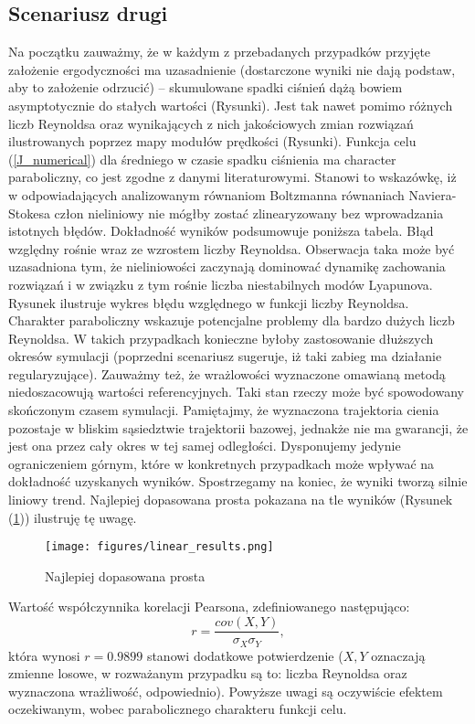 \documentclass[12pt]{article}
\begin{document}
\subsection{Scenariusz drugi}
Na początku zauważmy, że w każdym z przebadanych przypadków przyjęte założenie ergodyczności ma uzasadnienie (dostarczone wyniki nie dają podstaw, aby to założenie odrzucić) – skumulowane spadki ciśnień dążą bowiem asymptotycznie do stałych wartości (Rysunki).  Jest tak nawet pomimo różnych liczb Reynoldsa oraz wynikających z nich jakościowych zmian rozwiązań ilustrowanych poprzez mapy modułów prędkości (Rysunki). \newline
Funkcja celu (\ref{J_numerical}) dla średniego w czasie spadku ciśnienia ma character paraboliczny, co jest zgodne z danymi literaturowymi. Stanowi to wskazówkę, iż w odpowiadających analizowanym równaniom Boltzmanna równaniach Naviera-Stokesa człon nieliniowy nie mógłby zostać zlinearyzowany bez wprowadzania istotnych błędów. \newline
Dokładność wyników podsumowuje  poniższa tabela.
Błąd względny rośnie wraz ze wzrostem liczby Reynoldsa. Obserwacja taka może być uzasadniona tym, że nieliniowości zaczynają dominować dynamikę zachowania rozwiązań i w związku z tym rośnie liczba niestabilnych modów Lyapunova. Rysunek ilustruje wykres błędu względnego w funkcji liczby Reynoldsa.
Charakter paraboliczny wskazuje potencjalne problemy dla bardzo dużych liczb Reynoldsa. W takich przypadkach konieczne byłoby zastosowanie dłuższych okresów symulacji (poprzedni scenariusz sugeruje, iż taki zabieg ma działanie regularyzujące). \newline
Zauważmy też, że wrażlowości wyznaczone omawianą metodą niedoszacowują wartości referencyjnych. Taki stan rzeczy może być spowodowany skończonym czasem symulacji. Pamiętajmy, że wyznaczona trajektoria cienia pozostaje w bliskim sąsiedztwie trajektorii bazowej, jednakże nie ma gwarancji, że jest ona przez cały okres w tej samej odległości. Dysponujemy jedynie ograniczeniem górnym, które w konkretnych przypadkach może wpływać na dokładność uzyskanych wyników. \newline
Spostrzegamy na koniec, że wyniki tworzą silnie liniowy trend. Najlepiej dopasowana prosta pokazana na tle wyników (Rysunek (\ref{Fig56})) ilustruję tę uwagę.
\begin{figure}[H]
	\texttt{[image: figures/linear\_results.png]} 
	\centering
	\caption{Najlepiej dopasowana prosta}
	\label{Fig56}
\end{figure}
Wartość współczynnika korelacji Pearsona, zdefiniowanego następująco:
\begin{equation}
r = \frac{cov(X,Y)}{\sigma_{X}\sigma_{Y}},
\end{equation}
która wynosi $ r = 0.9899 $ stanowi dodatkowe potwierdzenie ($ X, Y $ oznaczają zmienne losowe, w rozważanym przypadku są to: liczba Reynoldsa oraz wyznaczona wrażliwość, odpowiednio).\newline
Powyższe uwagi są oczywiście efektem oczekiwanym, wobec parabolicznego charakteru funkcji celu.\newline
\end{document}
